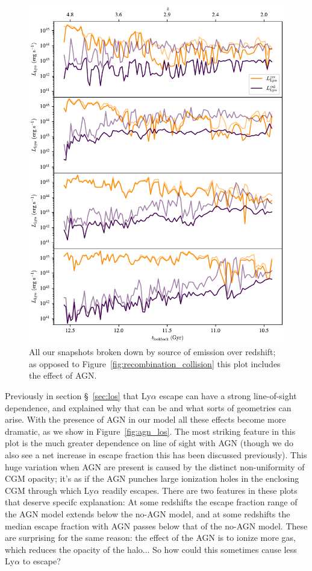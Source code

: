\begin{figure}
    \centering
    \includegraphics[width=\textwidth,height=\textheight,keepaspectratio]{figures/agn_recombination_collision.pdf}
    \caption{
        All our snapshots broken down by source of emission over redshift; as opposed to Figure~\ref{fig:recombination_collision} this plot includes the effect of AGN.
    }
    \label{fig:agn_recombination_collision}
\end{figure}

Previously in section \S~\ref{sec:los} that Ly$\alpha$ escape can have a strong line-of-sight dependence, and explained why that can be and what sorts of geometries can arise.
With the presence of AGN in our model all these effects become more dramatic, as we show in Figure~\ref{fig:agn_los}.
The most striking feature in this plot is the much greater dependence on line of sight with AGN (though we do also see a net increase in escape fraction this has been discussed previously).
This huge variation when AGN are present is caused by the distinct non-uniformity of CGM opacity; it's as if the AGN punches large ionization holes in the enclosing CGM through which Ly$\alpha$ readily escapes.
There are two features in these plots that deserve specifc explanation: At some redshifts the escape fraction range of the AGN model extends below the no-AGN model, and at some redshifts the median escape fraction with AGN passes below that of the no-AGN model.
These are surprising for the same reason: the effect of the AGN is to ionize more gas, which reduces the opacity of the halo... So how could this sometimes cause less Ly$\alpha$ to escape?

